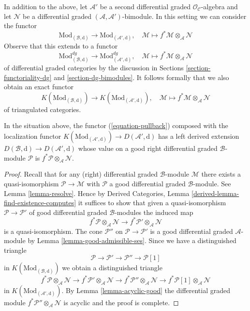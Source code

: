\medskip\noindent
In addition to the above, let $\mathcal{A}'$ be a second differential
graded $\mathcal{O}_\mathcal{C}$-algebra and let $\mathcal{N}$
be a differential graded $(\mathcal{A}, \mathcal{A}')$-bimodule.
In this setting we can consider the functor
$$
\text{Mod}_{(\mathcal{B}, \text{d})}
\longrightarrow
\text{Mod}_{(\mathcal{A}', \text{d})},\quad
\mathcal{M} \longmapsto f^*\mathcal{M} \otimes_{\mathcal{A}} \mathcal{N}
$$
Observe that this extends to a functor
$$
\text{Mod}^{dg}_{(\mathcal{B}, \text{d})}
\longrightarrow
\text{Mod}^{dg}_{(\mathcal{A}', \text{d})},\quad
\mathcal{M} \longmapsto f^*\mathcal{M} \otimes_{\mathcal{A}} \mathcal{N}
$$
of differential graded categories by the discussion in
Sections \ref{section-functoriality-dg} and \ref{section-dg-bimodules}.
It follows formally that we also obtain an exact functor
\begin{equation}
\label{equation-pullback}
K(\text{Mod}_{(\mathcal{B}, \text{d})})
\longrightarrow
K(\text{Mod}_{(\mathcal{A}', \text{d})}),\quad
\mathcal{M} \longmapsto f^*\mathcal{M} \otimes_{\mathcal{A}} \mathcal{N}
\end{equation}
of triangulated categories.

\begin{lemma}
\label{lemma-derived-tensor-product}
In the situation above, the functor (\ref{equation-pullback})
composed with the localization functor
$K(\text{Mod}_{(\mathcal{A}', \text{d})}) \to D(\mathcal{A}', \text{d})$
has a left derived extension
$D(\mathcal{B}, \text{d}) \to D(\mathcal{A}', \text{d})$ whose
value on a good right differential graded $\mathcal{B}$-module
$\mathcal{P}$ is $f^*\mathcal{P} \otimes_\mathcal{A} \mathcal{N}$.
\end{lemma}

\begin{proof}
Recall that for any (right) differential graded $\mathcal{B}$-module
$\mathcal{M}$ there exists a quasi-isomorphism $\mathcal{P} \to \mathcal{M}$
with $\mathcal{P}$ a good differential graded $\mathcal{B}$-module.
See Lemma \ref{lemma-resolve}.
Hence by Derived Categories, Lemma \ref{derived-lemma-find-existence-computes}
it suffices to show that given a quasi-isomorphism
$\mathcal{P} \to \mathcal{P}'$ of good differential graded
$\mathcal{B}$-modules the induced map
$$
f^*\mathcal{P} \otimes_\mathcal{A} \mathcal{N}
\longrightarrow
f^*\mathcal{P}' \otimes_\mathcal{A} \mathcal{N}
$$
is a quasi-isomorphism. The cone $\mathcal{P}''$ on
$\mathcal{P} \to \mathcal{P}'$ is a good differential graded
$\mathcal{A}$-module by Lemma \ref{lemma-good-admissible-ses}.
Since we have a distinguished triangle
$$
\mathcal{P} \to \mathcal{P}' \to \mathcal{P}'' \to \mathcal{P}[1]
$$
in $K(\text{Mod}_{(\mathcal{B}, \text{d})})$ we obtain a distinguished
triangle
$$
f^*\mathcal{P} \otimes_\mathcal{A} \mathcal{N} \to
f^*\mathcal{P}' \otimes_\mathcal{A} \mathcal{N} \to
f^*\mathcal{P}'' \otimes_\mathcal{A} \mathcal{N} \to
f^*\mathcal{P}[1] \otimes_\mathcal{A} \mathcal{N}
$$
in $K(\text{Mod}_{(\mathcal{A}', \text{d})})$. By
Lemma \ref{lemma-acyclic-good}
the differential graded module
$f^*\mathcal{P}'' \otimes_\mathcal{A} \mathcal{N}$
is acyclic and the proof is complete.
\end{proof}

